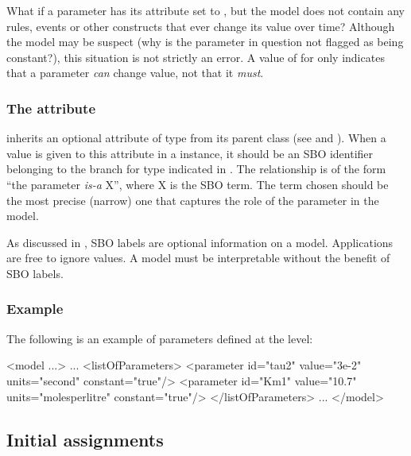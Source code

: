 What if a parameter has its  attribute set to
, but the model does not contain any rules, events or
other constructs that ever change its value over time?  Although
the model may be suspect (why is the parameter in question not
flagged as being constant?), this situation is not strictly an
error.  A value of  for  only indicates
that a parameter \emph{can} change value, not that it \emph{must}.


\subsubsection{The  attribute}
\label{sec:parameter-sboterm}

\Parameter inherits an optional 
attribute of type  from its parent
class \SBase (see 
and ).  When a value is given to this
attribute in a \Parameter instance, it should be an
SBO identifier belonging to the branch for type \Parameter 
indicated in .  The relationship is
of the form ``the parameter \emph{is-a} X'', where X is
the SBO term.  The term chosen should be the most precise (narrow)
one that captures the role of the parameter in the model.

As discussed in , SBO labels are optional
information on a model.  Applications are free to ignore
 values.  A model must be interpretable without the
benefit of SBO labels.


\subsubsection{Example}

The following is an example of parameters defined at the \Model level:

\begin{example}
<model ...>
    ...
    <listOfParameters>
        <parameter id="tau2" value="3e-2" units="second"        constant="true"/>
        <parameter id="Km1"  value="10.7" units="molesperlitre" constant="true"/>
    </listOfParameters>
    ...
</model>
\end{example}


\subsection{Initial assignments}
\label{sec:initialAssignment}

